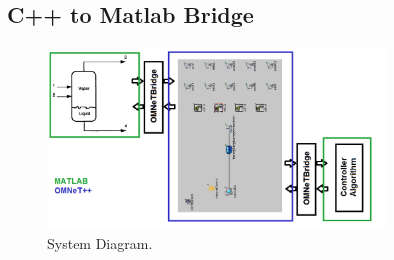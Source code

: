 \subsection{C++ to Matlab Bridge}


\begin{figure}
        \centering
		\includegraphics[width=0.8\textwidth]{figs/system.png}
        \caption{System Diagram.}
        \label{fig:system}        
\end{figure}